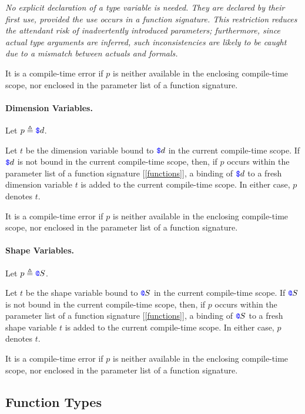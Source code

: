 \documentclass{article}
\begin{document}
 {\em 
No explicit declaration of a type variable is needed. They are declared by their first use, provided the use occurs in a function signature. This restriction reduces the attendant risk of inadvertently introduced parameters; furthermore, since
 actual type arguments are inferred, such inconsistencies are likely to be caught due to a mismatch between actuals and formals.
 } 
 
 It is a compile-time error if $p$ is neither available in the enclosing compile-time scope, nor enclosed in the parameter list of a function signature.
 
 \paragraph{Dimension Variables.}
 
 Let $p \triangleq \texttt{\color{blue} \$}{}d$.
 
 Let $t$ be the dimension variable bound to $\texttt{\color{blue} \$}{}d$ in the current compile-time scope. If $\texttt{\color{blue} \$}{}d$ is not bound in the current compile-time scope, then, if $p$ occurs within the parameter list of a function signature [\ref{functions}],  a binding of $\texttt{\color{blue} \$}{}d$ to a fresh dimension variable $t$ is added to the current compile-time scope. In either case, $p$ denotes  $t$. 

 
 It is a compile-time error if $p$ is neither available in the enclosing compile-time scope, nor enclosed in the parameter list of a function signature.
 
 \paragraph{Shape Variables.}


 Let $p \triangleq \texttt{\color{blue} @}{}{}S$.
 
 Let $t$ be the shape variable bound to  $\texttt{\color{blue} @}{}{}S$ in the current compile-time scope. If $\texttt{\color{blue} @}{}{}S$ is not bound in the current compile-time scope, then, if $p$ occurs within the parameter list of a function signature [\ref{functions}],  a binding of  $\texttt{\color{blue} @}{}{}S$ to a fresh shape variable $t$ is added to the current compile-time scope. In either case, $p$ denotes  $t$. 
 
 It is a compile-time error if $p$ is neither available in the enclosing compile-time scope, nor enclosed in the parameter list of a function signature.
 

 
\subsection{Function Types}
\label{functionTypes}
\end{document}
